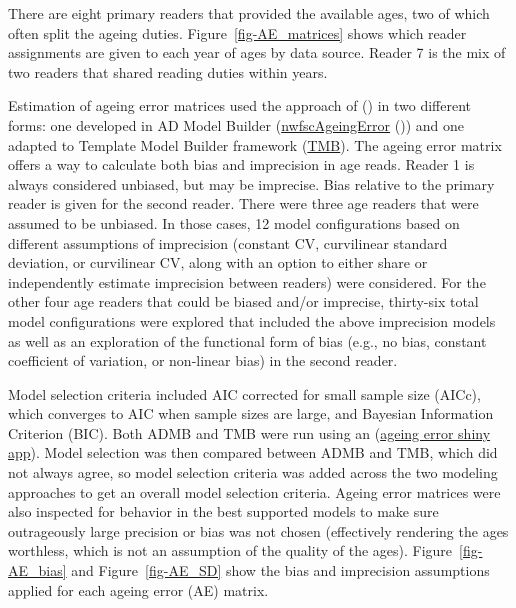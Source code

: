 \documentclass[
]{scrartcl}
\begin{document}
There are eight primary readers that provided the available ages, two of
which often split the ageing duties. Figure~\ref{fig-AE_matrices} shows
which reader assignments are given to each year of ages by data source.
Reader 7 is the mix of two readers that shared reading duties within
years.

Estimation of ageing error matrices used the approach of
() in two different forms: one
developed in AD Model Builder
(\href{https://github.com/pfmc-assessments/nwfscAgeingError}{nwfscAgeingError}
()) and one adapted to Template Model Builder framework
(\href{https://pfmc-assessments.github.io/AgeingError/articles/getting_started.html}{TMB}).
The ageing error matrix offers a way to calculate both bias and
imprecision in age reads. Reader 1 is always considered unbiased, but
may be imprecise. Bias relative to the primary reader is given for the
second reader. There were three age readers that were assumed to be
unbiased. In those cases, 12 model configurations based on different
assumptions of imprecision (constant CV, curvilinear standard deviation,
or curvilinear CV, along with an option to either share or independently
estimate imprecision between readers) were considered. For the other
four age readers that could be biased and/or imprecise, thirty-six total
model configurations were explored that included the above imprecision
models as well as an exploration of the functional form of bias (e.g.,
no bias, constant coefficient of variation, or non-linear bias) in the
second reader.

Model selection criteria included AIC corrected for small sample size
(AICc), which converges to AIC when sample sizes are large, and Bayesian
Information Criterion (BIC). Both ADMB and TMB were run using an
(\href{https://github.com/shcaba/Ageing_Error_app}{ageing error shiny app}).
Model selection was then compared between ADMB and TMB, which did not
always agree, so model selection criteria was added across the two
modeling approaches to get an overall model selection criteria. Ageing
error matrices were also inspected for behavior in the best supported
models to make sure outrageously large precision or bias was not chosen
(effectively rendering the ages worthless, which is not an assumption of
the quality of the ages). Figure~\ref{fig-AE_bias} and
Figure~\ref{fig-AE_SD} show the bias and imprecision assumptions applied
for each ageing error (AE) matrix.
\end{document}
